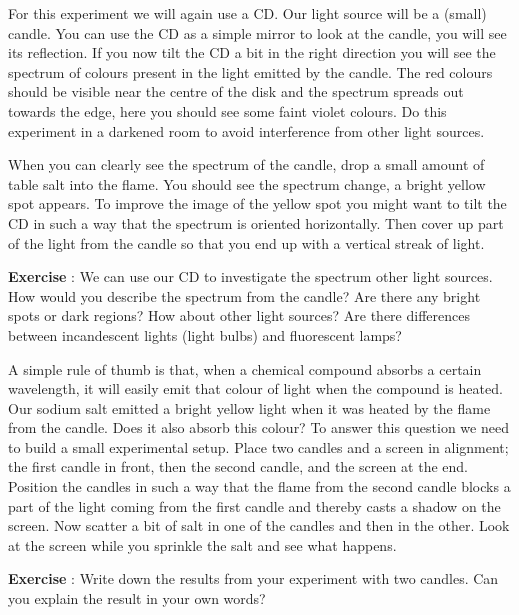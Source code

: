 For this experiment we will again use a CD. Our light source will be a (small) candle. You can use the CD as a simple mirror to look at the candle, you will see its reflection. If you now tilt the CD a bit in the right direction you will see the spectrum of colours present in the light emitted by the candle. The red colours should be visible near the centre of the disk and the spectrum spreads out towards the edge, here you should see some faint violet colours. Do this experiment in a darkened room to avoid interference from other light sources.

When you can clearly see the spectrum of the candle, drop a small amount of table salt into the flame. You should see the spectrum change, a bright yellow spot appears. To improve the image of the yellow spot you might want to tilt the CD in such a way that the spectrum is oriented horizontally. Then cover up part of the light from the candle so that you end up with a vertical streak of light.

\begin{shaded}
\textbf{Exercise \theExercise {}} : We can use our CD to investigate the spectrum other light sources. How would you describe the spectrum from the candle? Are there any bright spots or dark regions? How about other light sources? Are there differences between incandescent lights (light bulbs) and fluorescent lamps? \end{shaded}

A simple rule of thumb is that, when a chemical compound absorbs a certain wavelength, it will easily emit that colour of light when the compound is heated. Our sodium salt emitted a bright yellow light when it was heated by the flame from the candle. Does it also absorb this colour? To answer this question we need to build a small experimental setup. Place two candles and a screen in alignment; the first candle in front, then the second candle, and the screen at the end. Position the candles in such a way that the flame from the second candle blocks a part of the light coming from the first candle and thereby casts a shadow on the screen. Now scatter a bit of salt in one of the candles and then in the other. Look at the screen while you sprinkle the salt and see what happens.
\begin{shaded}
\textbf{Exercise \theExercise {}} : Write down the results from your experiment with two candles. Can you explain the result in your own words?\end{shaded}


